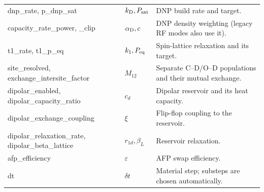 \documentclass[11pt]{article}
\begin{document}
\begin{longtable}{>{\ttfamily}L{0.33\textwidth} L{0.08\textwidth} L{0.51\textwidth}}
dnp\_rate, p\_dnp\_sat & \(k_{\rm D},P_{\rm sat}\) & DNP build rate and target.\\
capacity\_rate\_power, \_clip & \(\alpha_{\rm D},c\) & DNP density weighting (legacy RF modes also use it).\\
t1\_rate, t1\_p\_eq & \(k_1,P_{\rm eq}\) & Spin-lattice relaxation and its target.\\
site\_resolved, exchange\_intersite\_factor & \(M_{12}\) & Separate C--D/O--D populations and their mutual exchange.\\
dipolar\_enabled, dipolar\_capacity\_ratio & \(c_d\) & Dipolar reservoir and its heat capacity.\\
dipolar\_exchange\_coupling & \(\xi\) & Flip-flop coupling to the reservoir.\\
dipolar\_relaxation\_rate, dipolar\_beta\_lattice & \(r_{1d},\beta_L\) & Reservoir relaxation.\\
afp\_efficiency & \(\varepsilon\) & AFP swap efficiency.\\
dt & \(\delta t\) & Material step; substeps are chosen automatically.\\
\bottomrule
\end{longtable}
\end{document}
